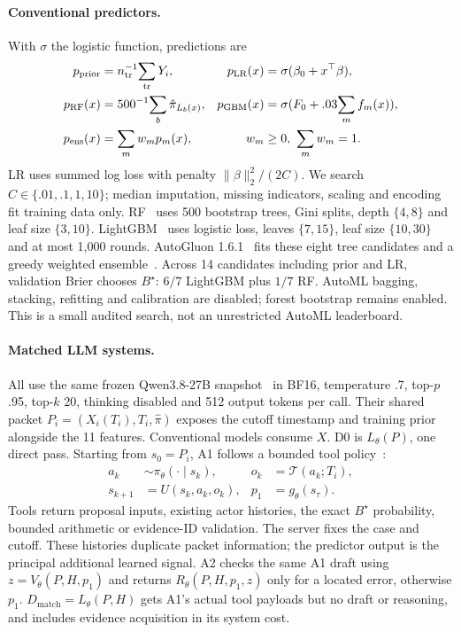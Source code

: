 \documentclass[sigconf,anonymous,review]{acmart}
\begin{document}
\paragraph{Conventional predictors.}
With $\sigma$ the logistic function, predictions are
\begin{equation}
\begin{aligned}
p_{\rm prior}&=n_{\rm tr}^{-1}\!\sum_{\rm tr}Y_i,&
p_{\rm LR}(x)&=\sigma(\beta_0+x^\top\beta),\\
p_{\rm RF}(x)&=500^{-1}\!\sum_b\hat\pi_{L_b(x)},&
p_{\rm GBM}(x)&=\sigma(F_0+.03\!\sum_m f_m(x)),\\
p_{\rm ens}(x)&=\sum_m w_mp_m(x),&w_m&\ge0,\ \sum_mw_m=1.
\end{aligned}
\end{equation}
LR uses summed log loss with penalty $\|\beta\|_2^2/(2C)$. We search $C\in\{.01,.1,1,10\}$; median imputation, missing indicators, scaling and encoding fit training data only. RF~\cite{breiman2001} uses 500 bootstrap trees, Gini splits, depth $\{4,8\}$ and leaf size $\{3,10\}$. LightGBM~\cite{ke2017} uses logistic loss, leaves $\{7,15\}$, leaf size $\{10,30\}$ and at most 1,000 rounds. AutoGluon 1.6.1~\cite{erickson2020} fits these eight tree candidates and a greedy weighted ensemble~\cite{caruana2004}. Across 14 candidates including prior and LR, validation Brier chooses $B^\star$: $6/7$ LightGBM plus $1/7$ RF. AutoML bagging, stacking, refitting and calibration are disabled; forest bootstrap remains enabled. This is a small audited search, not an unrestricted AutoML leaderboard.

\paragraph{Matched LLM systems.}
All use the same frozen Qwen3.8-27B snapshot~\cite{qwen2026} in BF16, temperature .7, top-$p$ .95, top-$k$ 20, thinking disabled and 512 output tokens per call. Their shared packet $P_i=(X_i(T_i),T_i,\hat\pi)$ exposes the cutoff timestamp and training prior alongside the 11 features. Conventional models consume $X$. D0 is $L_\theta(P)$, one direct pass. Starting from $s_0=P_i$, A1 follows a bounded tool policy~\cite{yao2023react}:
\begin{equation}
\begin{aligned}
a_k&\sim\pi_\theta(\cdot\mid s_k), & o_k&=\mathcal T(a_k;T_i),\\
s_{k+1}&=U(s_k,a_k,o_k), & p_1&=g_\theta(s_\tau).
\end{aligned}
\end{equation}
Tools return proposal inputs, existing actor histories, the exact $B^\star$ probability, bounded arithmetic or evidence-ID validation. The server fixes the case and cutoff. These histories duplicate packet information; the predictor output is the principal additional learned signal. A2 checks the same A1 draft using $z=V_\theta(P,H,p_1)$ and returns $R_\theta(P,H,p_1,z)$ only for a located error, otherwise $p_1$. $D_{\mathrm{match}}=L_\theta(P,H)$ gets A1's actual tool payloads but no draft or reasoning, and includes evidence acquisition in its system cost.
\end{document}
